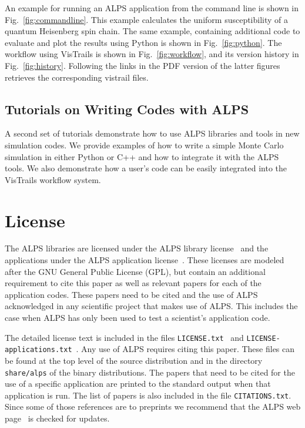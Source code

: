 \documentclass[12pt]{iopart}
\begin{document}
An example for running an ALPS application from the command line is shown in Fig.~\ref{fig:commandline}. This example calculates the uniform susceptibility of a quantum Heisenberg spin chain. The same example, containing additional code to evaluate and plot the results using Python is shown in Fig.~\ref{fig:python}. The workflow using VisTrails is shown in Fig.~\ref{fig:workflow}, and its version history in Fig.~\ref{fig:history}. Following the links in the PDF version of the latter figures retrieves the corresponding vistrail files.

\subsection{Tutorials on Writing Codes with ALPS}

A second set of tutorials demonstrate how to use ALPS libraries and tools in new simulation codes. We provide examples of how to write a simple Monte Carlo simulation in either Python or C++ and how to integrate it with the ALPS tools. We also demonstrate how a user's code can be easily integrated into the VisTrails workflow system.


\section{License}
The ALPS libraries are licensed under the ALPS library license~\cite{librarylicense} and the applications under the ALPS application license~\cite{applicationlicense}. These licenses are modeled after the GNU General Public License (GPL), but contain an additional requirement to cite this paper as well as relevant papers for each of the application codes. These papers need to be cited and the use of ALPS acknowledged in any scientific project that makes use of ALPS. This includes the case when ALPS has only been used to test a scientist's application code.

The detailed license text is included in the files {\tt LICENSE.txt}~\cite{librarylicense} and {\tt LICENSE-applications.txt}~\cite{applicationlicense}. Any use of ALPS requires citing this paper. These files can be found at the top level of the source distribution and in the directory {\tt share/alps} of the binary distributions. The papers that need to be cited for the use of a specific application are printed to the standard output when that application is run. The list of papers is also included in the file {\tt CITATIONS.txt}. Since some of those references are to preprints we recommend that the ALPS web page~\cite{alps} is checked for updates.
\end{document}
